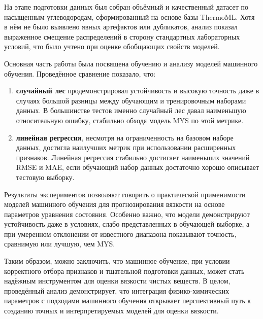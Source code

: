 \documentclass[a4paper,12pt]{article}
\begin{document}
  На этапе подготовки данных был собран объёмный и качественный датасет по насыщенным углеводородам, сформированный на основе базы ThermoML. Хотя в нём не было выявлено явных артефактов или дубликатов, анализ показал выраженное смещение распределений в сторону стандартных лабораторных условий, что было учтено при оценке обобщающих свойств моделей.

  Основная часть работы была посвящена обучению и анализу моделей машинного обучения. Проведённое сравнение показало, что:

  \begin{enumerate}
    \item \textbf{случайный лес} продемонстрировал устойчивость и высокую точность даже в случаях большой разницы между обучающим и тренировочным наборами данных. В большинстве тестов именно случайный лес давал наименьшую относительную ошибку, стабильно обходя модель MYS по этой метрике.

    \item \textbf{линейная регрессия}, несмотря на ограниченность на базовом наборе данных, достигла наилучших метрик при использовании расширенных признаков. Линейная регрессия стабильно достигает наименьших значений RMSE и MAE, если обучающий набор данных достаточно хорошо описывает тестовую выборку.  
  \end{enumerate}

  Результаты экспериментов позволяют говорить о практической применимости моделей машинного обучения для прогнозирования вязкости на основе параметров уравнения состояния. Особенно важно, что модели демонстрируют устойчивость даже в условиях, слабо представленных в обучающей выборке, а при умеренном отклонении от известного диапазона показывают точность, сравнимую или лучшую, чем MYS.

Таким образом, можно заключить, что машинное обучение, при условии корректного отбора признаков и тщательной подготовки данных, может стать надёжным инструментом для оценки вязкости чистых веществ. В целом, проведённый анализ демонстрирует, что интеграция физико-химических параметров с подходами машинного обучения открывает перспективный путь к созданию точных и интерпретируемых моделей для оценки вязкости.

\newpage
\end{document}
